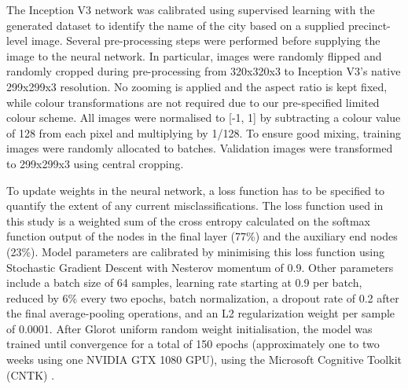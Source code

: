 \documentclass[sageh,times]{sagej}
\begin{document}
The Inception V3 network was calibrated using supervised learning with the generated dataset to identify the name of the city based on a supplied precinct-level image. Several pre-processing steps were performed before supplying the image to the neural network. In particular, images were randomly flipped and randomly cropped during pre-processing from 320x320x3 to Inception V3's native 299x299x3 resolution. No zooming is applied and the aspect ratio is kept fixed, while colour transformations are not required due to our pre-specified limited colour scheme. All images were normalised to [-1, 1] by subtracting a colour value of 128 from each pixel and multiplying by 1/128. To ensure good mixing, training images were randomly allocated to batches. Validation images were transformed to 299x299x3 using central cropping.

To update weights in the neural network, a loss function has to be specified to quantify the extent of any current misclassifications. The loss function used in this study is a weighted sum of the cross entropy calculated on the softmax function output of the nodes in the final layer (77\%) and the auxiliary end nodes (23\%). Model parameters are calibrated by minimising this loss function using Stochastic Gradient Descent with Nesterov momentum of 0.9. Other parameters include a batch size of 64 samples, learning rate starting at 0.9 per batch, reduced by 6\% every two epochs, batch normalization, a dropout rate of 0.2 after the final average-pooling operations, and an L2 regularization weight per sample of 0.0001. After Glorot uniform random weight initialisation, the model was trained until convergence for a total of 150 epochs (approximately one to two weeks using one NVIDIA GTX 1080 GPU), using the Microsoft Cognitive Toolkit (CNTK) \citep{Yu2015}. 
\end{document}
